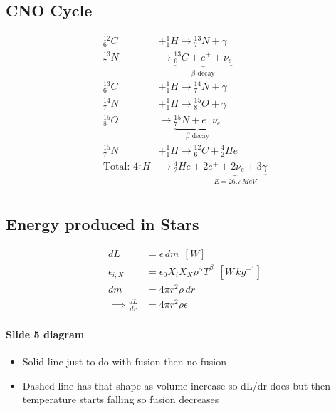 \documentclass[a4paper,11pt,normalem]{article}
\begin{document}
\subsection{CNO Cycle}

\begin{align*}
    {}^{12}_{6}C &+ {}^{1}_{1}H \to {}^{13}_{7}N + \gamma \\
    {}^{13}_{7}N  &\to \underbrace{{}^{13}_{6}C + e^+ + \nu_e}_{\beta\text{ decay}} \\
    {}^{13}_{6}C &+ {}^{1}_{1}H \to {}^{14}_{7}N + \gamma \\
    {}^{14}_{7}N &+ {}^{1}_{1}H \to {}^{15}_{8}O + \gamma \\
    {}^{15}_{8}O &\to \underbrace{{}^{15}_{7}N + e^+ \nu_e}_{\beta\text{ decay}} \\
    {}^{15}_{7}N &+ {}^{1}_{1}H \to {}^{12}_{6}C + {}^{4}_{2}He \\
    \text{Total: }4{}^{1}_{1}H &\to {}^{4}_{2}He + \underbrace{2e^+ + 2\nu_e + 3\gamma}_{E = 26.7\,MeV}
\end{align*}

\section{}

\subsection{Energy produced in Stars}

\begin{align*}
    dL &= \epsilon\,dm ~~ [W] \\
    \epsilon_{i,X} &= \epsilon_0 X_i X_X \rho^\alpha T^\beta ~~ [W\,kg^{-1}] \\
    dm &= 4\pi r^2\rho\,dr \\
    \implies \frac{dL}{dr} &= 4\pi r^2 \rho \epsilon
\end{align*}

\paragraph{Slide 5 diagram}

\begin{itemize}
    \item Solid line just to do with fusion then no fusion
    \item Dashed line has that shape as volume increase so dL/dr does but then temperature starts falling so fusion decreases
\end{itemize}
\end{document}
